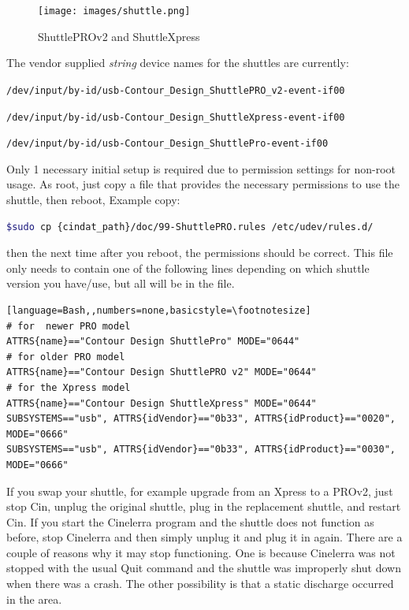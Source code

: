 \begin{figure}[htpb]
    \centering
    \texttt{[image: images/shuttle.png]}
    \caption{ShuttlePROv2 and ShuttleXpress}
    \label{fig:shuttle}
\end{figure}

\noindent The vendor supplied \textit{string} device names for the shuttles are currently:

{\small
\vspace{1ex} \texttt{/dev/input/by-id/usb-Contour\_Design\_ShuttlePRO\_v2-event-if00}
 
 \texttt{/dev/input/by-id/usb-Contour\_Design\_ShuttleXpress-event-if00}
 
 \texttt{/dev/input/by-id/usb-Contour\_Design\_ShuttlePro-event-if00}
 }

\vspace{1ex}
\noindent Only 1 necessary initial setup is required due to permission settings for non-root usage. As root, just copy a file that provides the necessary permissions to use the shuttle, then reboot,  Example copy:

\begin{lstlisting}[language=Bash,numbers=none]
$sudo cp {cindat_path}/doc/99-ShuttlePRO.rules /etc/udev/rules.d/
\end{lstlisting}

\noindent then the next time after you reboot, the permissions should be correct. This file only needs to contain one of the following lines depending on which shuttle version you have/use, but all will be in the file.
\begin{lstlisting}[language=Bash,,numbers=none,basicstyle=\footnotesize]
# for  newer PRO model 
ATTRS{name}=="Contour Design ShuttlePro" MODE="0644"		
# for older PRO model 
ATTRS{name}=="Contour Design ShuttlePRO v2" MODE="0644"	
# for the Xpress model 
ATTRS{name}=="Contour Design ShuttleXpress" MODE="0644"	
SUBSYSTEMS=="usb", ATTRS{idVendor}=="0b33", ATTRS{idProduct}=="0020", MODE="0666" 
SUBSYSTEMS=="usb", ATTRS{idVendor}=="0b33", ATTRS{idProduct}=="0030", MODE="0666"
\end{lstlisting}
If you swap your shuttle, for example upgrade from an Xpress to a PROv2, just stop Cin, unplug the original shuttle, plug in the replacement shuttle, and restart Cin.  If you start the Cinelerra program and the shuttle does not function as before, stop Cinelerra and then simply unplug it and plug it in again.  There are a couple of reasons why it may stop functioning.  One is because Cinelerra was not stopped with the usual Quit command and the shuttle was improperly shut down when there was a crash.  The other possibility is that a static discharge occurred in the area.


